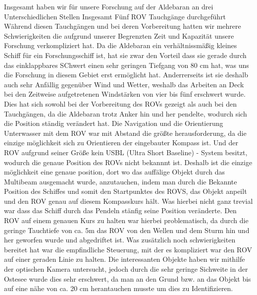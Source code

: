 Insgesamt haben wir für unsere Forschung auf der Aldebaran an drei Unterschiedlichen Stellen Insgesamt Fünf ROV Tauchgänge durchgeführt 
Während diesen Tauchgängen und bei deren Vorbereitung hatten wir mehrere Schwierigkeiten die aufgrund unserer Begrenzten Zeit und Kapazität unsere Forschung verkompliziert hat.
Da die Aldebaran ein verhältnissmäßig kleines Schiff für ein Forschungsschiff ist, hat sie zwar den Vorteil dass sie gerade durch das einklappbares SChwert einen sehr geringen Tiefgang von 80 cm hat, was uns die Forschung in diesem Gebiet erst ermöglicht hat.
Anderrerseits ist sie deshalb auch sehr Anfällig gegenüber Wind und Wetter, weshalb das Arbeiten an Deck bei den Zeitweise aufgetretenen Windstärken von vier bis fünf erschwert wurde.
Dies hat sich sowohl bei der Vorbereitung des ROVs gezeigt als auch bei den Tauchgängen, da die Aldebaran trotz Anker hin und her pendelte, wodurch sich die Position ständig verändert hat.
Die Navigation und die Orientierung Unterwasser mit dem ROV war mit Abstand die größte herausforderung, da die einzige möglichkeit sich zu Orientieren der eingebauter Kompass ist.
Und der ROV aufgrund seiner Größe kein USBL (Ultra Short Baseline) - System besitzt, wodurch die genaue Position des ROVs nicht bekannnt ist.
Deshalb ist die einzige möglichkeit eine genaue position, dort wo das auffälige Objekt durch das Multibeam ausgemacht wurde, anzutauchen, indem man durch die Bekannte Position des Schiffes und somit den Startpunktes des ROVS, das Objekt anpeilt und den ROV genau auf diesem Kompasskurs hält.
Was hierbei nicht ganz trevial war dass das Schiff durch das Pendeln stänfig seine Position veränderte.
Den ROV auf einem genauen Kurs zu halten war hierbei problematisch, da durch die geringe Tauchtiefe von ca. 5m das ROV von den Wellen und dem Sturm hin und her geworfen wurde und abgedriftet ist.
Was zusätzlich noch schwierigkeiten bereitet hat war die empfindliche Steuerung, mit der es kompliziert war den ROV auf einer geraden Linie zu halten.
Die interessanten Objekte haben wir mithilfe der optischen Kamera untersucht, jedoch durch die sehr geringe Sichweite in der Ostesee wurde dies sehr erschwert, da man an den Grund bzw. an das Objekt bis auf eine nähe von ca. 20 cm herantauchen musste um dies zu Identifizieren. 
\\

